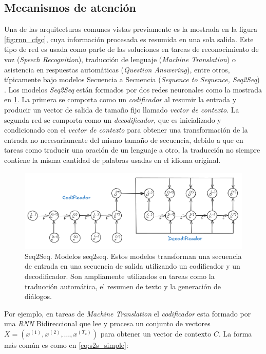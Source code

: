 \subsection{Mecanismos de atención} \label{section:att}

Una de las arquitecturas comunes vistas previamente es la mostrada en la figura \ref{fig:rnn_cfgc}, cuya información
procesada es resumida en una sola salida. Este tipo de red es usada como parte de las soluciones en
tareas de reconocimiento de voz (\textit{Speech Recognition}), traducción de lenguaje
(\textit{Machine Translation}) o asistencia en respuestas automáticas (\textit{Question Answering}), entre
otros,
típicamente bajo modelos Secuencia a Secuencia (\textit{Sequence to Sequence, Seq2Seq})
\cite{DBLP:journals/corr/ChoMGBSB14}. Los modelos
\textit{Seq2Seq} están formados por dos redes neuronales como la mostrada en \ref{fig:seq2seq}. La
primera se comporta como un \textit{codificador} al resumir la entrada y producir un vector de salida
de tamaño fijo llamado \textit{vector de contexto}. La segunda red se comporta como un
\textit{decodificador}, que es inicializado y condicionado con el
\textit{vector de contexto} para obtener una transformación de la entrada no necesariamente del
mismo tamaño de secuencia, debido a que en tareas como traducir una oración de un lenguaje a otro,
la traducción no siempre contiene la misma cantidad de palabras usadas en el idioma original.


\begin{figure}[ht!]
    \centering
    \includegraphics[width=1.0 \textwidth]{Chapters/2. Transformer/Figures/rnn/seq2seq.png}
    \caption{Seq2Seq. Modelos seq2seq. Estos modelos transforman una secuencia de entrada en una
             secuencia de salida utilizando un codificador y un decodificador. Son ampliamente
             utilizados en tareas como la traducción automática, el resumen de texto y la generación
             de diálogos.}
    \label{fig:seq2seq}
\end{figure}

Por ejemplo, en tareas de \textit{Machine Translation} el \textit{codificador} esta formado por una
\textit{RNN} Bidireccional que lee y procesa un conjunto de
vectores $X = (x^{(1)}, x^{(2)}, \dots, x^{(T_x)})$ para obtener un vector de contexto $C$. La forma
más común es como en \ref{eq:s2s_simple}:

